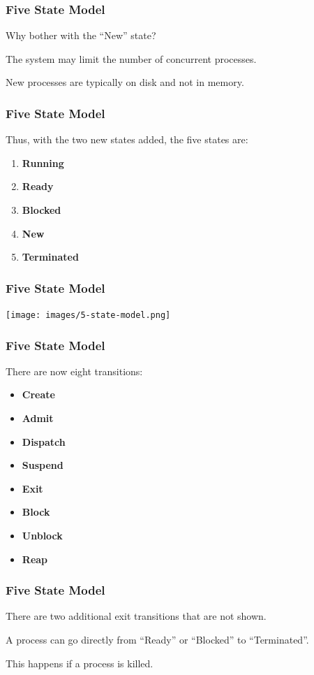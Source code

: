 \begin{frame}
\frametitle{Five State Model}
Why bother with the ``New'' state?

The system may limit the number of concurrent processes.

New processes are typically on disk and not in memory.

\end{frame}

\begin{frame}
\frametitle{Five State Model}

Thus, with the two new states added, the five states are:

\begin{enumerate}
 \item \textbf{Running}
 \item \textbf{Ready}
 \item \textbf{Blocked}
 \item \textbf{New}
 \item \textbf{Terminated}
\end{enumerate}

\end{frame}

\begin{frame}
\frametitle{Five State Model}

\begin{center}
\texttt{[image: images/5-state-model.png]}
\end{center}

\end{frame}

\begin{frame}
\frametitle{Five State Model}

There are now eight transitions:

\begin{itemize}
	\item \textbf{Create}
	\item \textbf{Admit}
	\item \textbf{Dispatch}
	\item \textbf{Suspend}
	\item \textbf{Exit}
	\item \textbf{Block}
	\item \textbf{Unblock}
	\item \textbf{Reap}
\end{itemize}

\end{frame}

\begin{frame}
\frametitle{Five State Model}

There are two additional exit transitions that are not shown.

A process can go directly from ``Ready'' or ``Blocked'' to ``Terminated''.

This happens if a process is killed.


\end{frame}

